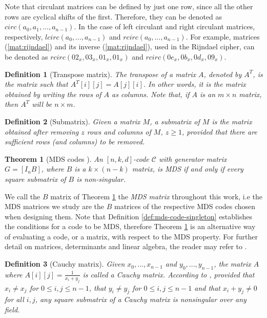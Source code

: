 \documentclass{report}
\newtheorem{definition}{Definition}{\bfseries}{\itshape}
\newtheorem{theorem}{Theorem}{\bfseries}{\itshape}
\begin{document}
Note that circulant matrices can be defined by just one row, since all the other rows are cyclical shifts of the first. Therefore, they can be denoted as $circ(a_0, a_1, ..., a_{n-1})$. In the case of left circulant and right circulant matrices, respectively, $lcirc(a_0, ..., a_{n-1})$ and $rcirc(a_0, ..., a_{n-1})$. For example, matrices (\ref{mat:rijndael}) and its inverse (\ref{mat:rijndael}), used in the Rijndael cipher, can be denoted as $rcirc(02_x, 03_x, 01_x, 01_x)$ and $rcirc(0e_x, 0b_x, 0d_x, 09_x)$.

\begin{definition}[Transpose matrix]
The transpose of a matrix $A$, denoted by $A^T$, is the matrix such that $A^T[i][j] = A[j][i]$. In other words, it is the matrix obtained by writing the rows of $A$ as columns. Note that, if $A$ is an $m \times n$ matrix, then $A^T$ will be $n \times m$.
\end{definition}

\begin{definition}[Submatrix]
Given a matrix $M$, a submatrix of $M$ is the matrix obtained after removing $z$ rows and columns of $M$, $z \geq 1$, provided that there are sufficient rows (and columns) to be removed.
\end{definition}

\begin{theorem}[MDS codes \cite{SloaneBook}]\label{teo:mds}
An $[n, k, d]$-code $\mathcal{C}$ with generator matrix $G = [I_nB]$, where $B$ is a $k \times (n - k)$ matrix, is MDS if and only if every square submatrix of $B$ is non-singular.
\end{theorem}

We call the $B$ matrix of Theorem \ref{teo:mds} the \emph{MDS matrix} throughout this work, i.e the MDS matrices we study are the $B$ matrices of the respective MDS codes chosen when designing them.
Note that Definition \ref{def:mds-code-singleton} establishes the conditions for a code to be MDS, therefore Theorem \ref{teo:mds} is an alternative way of evaluating a code, or a matrix, with respect to the MDS property.
For further detail on matrices, determinants and linear algebra, the reader may refer to \cite{LangeLinearAlgebra}.

\begin{definition}[Cauchy matrix]\label{def:cauchy}
Given $x_0, ..., x_{n-1}$ and $y_0, ..., y_{n-1}$, the matrix $A$ where $A[i][j] = \frac{1}{x_i + y_j}$ is called a Cauchy matrix. According to \cite{Youssef1997}, provided that $x_i \neq x_j$ for $0\leq i,j\leq n-1$, that $y_i \neq y_j$ for $0\leq i,j\leq n-1$ and that $x_i + y_j \neq 0$ for all $i, j$, any square submatrix of a Cauchy matrix is nonsingular over any field.
\end{definition}
\end{document}
